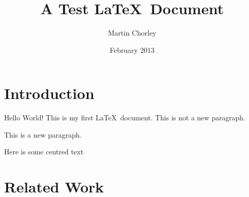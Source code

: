 \documentclass[12pt,twoside,a4paper]{article}
\title{A Test \LaTeX\ Document}
\author{Martin Chorley}
\date{February 2013}
\begin{document}
\maketitle

\begin{abstract}
\lipsum[2]
\end{abstract}

\section*{Introduction}
Hello World! This is       my       first       \LaTeX\     document.
This is not a new paragraph.

This is a new paragraph.
\begin{center}Here is some centred text\end{center}

\lipsum[1-4]

\section{Related Work}
\lipsum[5-6]
\end{document}
